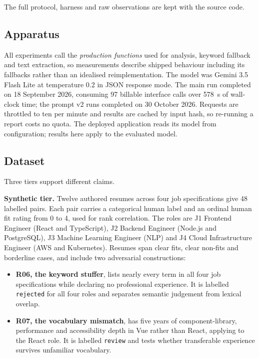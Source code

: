 \documentclass[conference]{IEEEtran}
\begin{document}
The full protocol, harness and raw observations are kept with the source code.

\subsection{Apparatus}

All experiments call the \textit{production functions} used for analysis,
keyword fallback and text extraction, so measurements describe shipped behaviour
including its fallbacks rather than an idealised reimplementation. The model was
Gemini 3.5 Flash Lite at temperature 0.2 in JSON response mode. The main run
completed on 18 September 2026, consuming 97 billable interface calls over 578~s
of wall-clock time; the prompt v2 runs completed on 30 October 2026. Requests
are throttled to ten per minute and results are cached by input hash, so
re-running a report costs no quota. The deployed application reads its model
from configuration; results here apply to the evaluated model.

\subsection{Dataset}

Three tiers support different claims.

\textbf{Synthetic tier.} Twelve authored resumes across four job specifications
give 48 labelled pairs. Each pair carries a categorical human label and an
ordinal human fit rating from 0 to 4, used for rank correlation. The roles are
J1 Frontend Engineer (React and TypeScript), J2 Backend Engineer (Node.js and
PostgreSQL), J3 Machine Learning Engineer (NLP) and J4 Cloud Infrastructure
Engineer (AWS and Kubernetes). Resumes span clear fits, clear non-fits and
borderline cases, and include two adversarial constructions:

\begin{itemize}
\item \textbf{R06, the keyword stuffer}, lists nearly every term in all four job
specifications while declaring no professional experience. It is labelled
\texttt{rejected} for all four roles and separates semantic judgement from
lexical overlap.
\item \textbf{R07, the vocabulary mismatch}, has five years of
component-library, performance and accessibility depth in Vue rather than React,
applying to the React role. It is labelled \texttt{review} and tests whether
transferable experience survives unfamiliar vocabulary.
\end{itemize}
\end{document}
